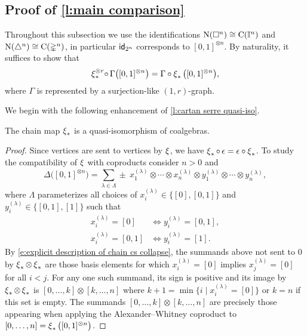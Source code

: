 \subsection{Proof of \cref{l:main comparison}} \label{ss:comparison proof}

Throughout this subsection we use the identifications $\operatorname{N}(\square^n) \cong \operatorname{C}(\mathbb{I}^n)$ and $\operatorname{N}(\triangle^n) \cong \operatorname{C}(\mathbb{\Delta}^n)$, in particular $\mathsf{id}_{2^n}$ corresponds to $[0,1]^{\otimes n}$.
By naturality, it suffices to show that
\begin{equation} \label{e:Cartan--Serre E-coalgebra map}
\operatorname{\xi}_\ast^{\otimes r} \! \circ \, \Gamma \big( [0,1]^{\otimes n} \big) =
\Gamma \circ \operatorname{\xi}_\ast \big( [0,1]^{\otimes n} \big),
\end{equation}
where $\Gamma$ is represented by a surjection-like $(1,r)$-graph.

We begin with the following enhancement of \cref{l:cartan serre quasi-iso}.

\begin{lemma}
	The chain map $\operatorname{\xi}_\ast$ is a quasi-isomorphism of coalgebras.
\end{lemma}

\begin{proof}
	Since vertices are sent to vertices by $\operatorname{\xi}$, we have $\operatorname{\xi}_\ast \circ \, \epsilon = \epsilon \circ \operatorname{\xi}_\ast$.
	To study the compatibility of $\operatorname{\xi}$ with coproducts consider $n > 0$ and
	\[
	\Delta \big( [0,1]^{\otimes n} \big) = \sum_{\lambda \in \Lambda} \pm \ x_1^{(\lambda)} \otimes \cdots \otimes x_n^{(\lambda)} \otimes y_1^{(\lambda)} \otimes \cdots \otimes y_n^{(\lambda)},
	\]
	where $\Lambda$ parameterizes all choices of $x_i^{(\lambda)} \in \{[0], [0,1]\}$ and $y_i^{(\lambda)} \in \{[0,1], [1]\}$ such that
	\begin{align*}
	x_i^{(\lambda)} = [0]   & \iff y_i^{(\lambda)} = [0,1], \\
	x_i^{(\lambda)} = [0,1] & \iff y_i^{(\lambda)} = [1].
	\end{align*}
	By \eqref{e:explicit description of chain cs collapse}, the summands above not sent to $0$ by $\operatorname{\xi}_\ast \otimes \operatorname{\xi}_\ast$ are those basis elements for which $x_i^{(\lambda)} = [0]$ implies $x_j^{(\lambda)} = [0]$ for all $i < j$.
	For any one such summand, its sign is positive and its image by $\operatorname{\xi}_\ast \otimes \operatorname{\xi}_\ast$ is $[0, \dots, k] \otimes [k, \dots, n]$ where $k+1 = \min \{i \mid x_i^{(\lambda)} = [0]\}$ or $k = n$ if this set is empty.
	The summands $[0, \dots, k] \otimes [k, \dots, n]$ are precisely those appearing when applying the Alexander--Whitney coproduct to $[0, \dots, n] = \operatorname{\xi}_\ast \big( [0,1]^{\otimes n} \big)$.
\end{proof}

